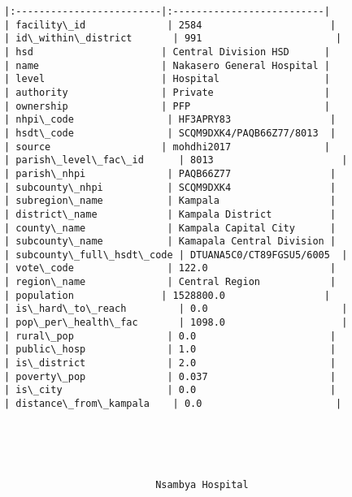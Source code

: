 \documentclass[11pt]{article}
\begin{document}
\begin{Verbatim}[commandchars=\\\{\}]
|:-------------------------|:--------------------------|
| facility\_id              | 2584                      |
| id\_within\_district       | 991                       |
| hsd                      | Central Division HSD      |
| name                     | Nakasero General Hospital |
| level                    | Hospital                  |
| authority                | Private                   |
| ownership                | PFP                       |
| nhpi\_code                | HF3APRY83                 |
| hsdt\_code                | SCQM9DXK4/PAQB66Z77/8013  |
| source                   | mohdhi2017                |
| parish\_level\_fac\_id      | 8013                      |
| parish\_nhpi              | PAQB66Z77                 |
| subcounty\_nhpi           | SCQM9DXK4                 |
| subregion\_name           | Kampala                   |
| district\_name            | Kampala District          |
| county\_name              | Kampala Capital City      |
| subcounty\_name           | Kamapala Central Division |
| subcounty\_full\_hsdt\_code | DTUANA5C0/CT89FGSU5/6005  |
| vote\_code                | 122.0                     |
| region\_name              | Central Region            |
| population               | 1528800.0                 |
| is\_hard\_to\_reach         | 0.0                       |
| pop\_per\_health\_fac       | 1098.0                    |
| rural\_pop                | 0.0                       |
| public\_hosp              | 1.0                       |
| is\_district              | 2.0                       |
| poverty\_pop              | 0.037                     |
| is\_city                  | 0.0                       |
| distance\_from\_kampala    | 0.0                       |





                          Nsambya Hospital                           


\end{Verbatim}
\end{document}
